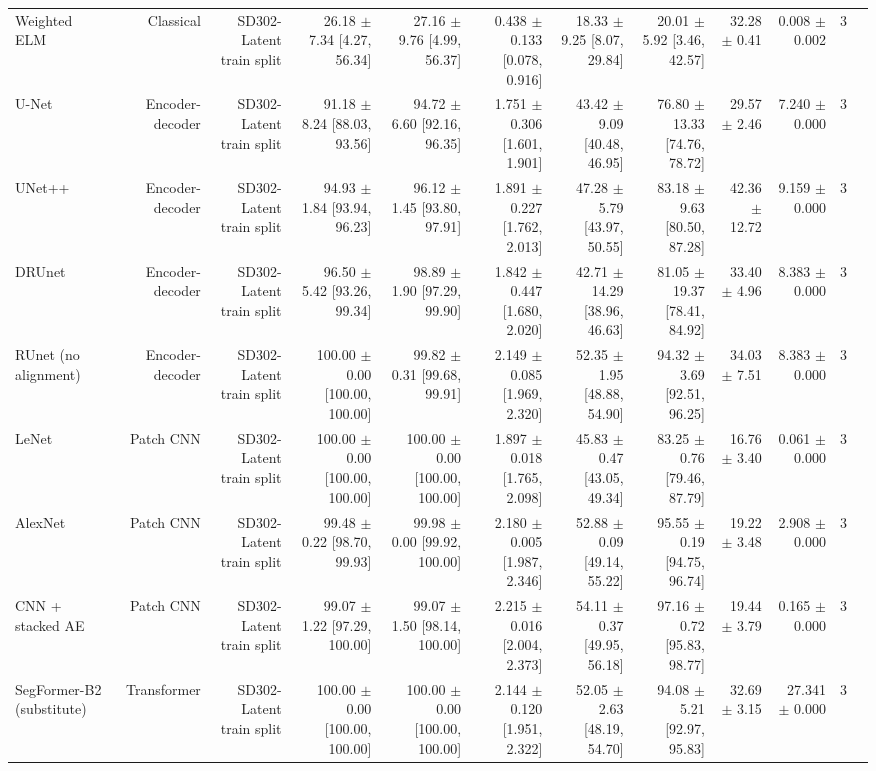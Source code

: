 \begin{table}[t]
\begin{tabular}{lrrrrrrrrrrr}
Weighted ELM & Classical & SD302-Latent train split & 26.18 $\pm$ 7.34 [4.27, 56.34] & 27.16 $\pm$ 9.76 [4.99, 56.37] & 0.438 $\pm$ 0.133 [0.078, 0.916] & 18.33 $\pm$ 9.25 [8.07, 29.84] & 20.01 $\pm$ 5.92 [3.46, 42.57] & 32.28 $\pm$ 0.41 & 0.008 $\pm$ 0.002 & 3 &  \\
U-Net & Encoder-decoder & SD302-Latent train split & 91.18 $\pm$ 8.24 [88.03, 93.56] & 94.72 $\pm$ 6.60 [92.16, 96.35] & 1.751 $\pm$ 0.306 [1.601, 1.901] & 43.42 $\pm$ 9.09 [40.48, 46.95] & 76.80 $\pm$ 13.33 [74.76, 78.72] & 29.57 $\pm$ 2.46 & 7.240 $\pm$ 0.000 & 3 &  \\
UNet++ & Encoder-decoder & SD302-Latent train split & 94.93 $\pm$ 1.84 [93.94, 96.23] & 96.12 $\pm$ 1.45 [93.80, 97.91] & 1.891 $\pm$ 0.227 [1.762, 2.013] & 47.28 $\pm$ 5.79 [43.97, 50.55] & 83.18 $\pm$ 9.63 [80.50, 87.28] & 42.36 $\pm$ 12.72 & 9.159 $\pm$ 0.000 & 3 &  \\
DRUnet & Encoder-decoder & SD302-Latent train split & 96.50 $\pm$ 5.42 [93.26, 99.34] & 98.89 $\pm$ 1.90 [97.29, 99.90] & 1.842 $\pm$ 0.447 [1.680, 2.020] & 42.71 $\pm$ 14.29 [38.96, 46.63] & 81.05 $\pm$ 19.37 [78.41, 84.92] & 33.40 $\pm$ 4.96 & 8.383 $\pm$ 0.000 & 3 &  \\
RUnet (no alignment) & Encoder-decoder & SD302-Latent train split & 100.00 $\pm$ 0.00 [100.00, 100.00] & 99.82 $\pm$ 0.31 [99.68, 99.91] & 2.149 $\pm$ 0.085 [1.969, 2.320] & 52.35 $\pm$ 1.95 [48.88, 54.90] & 94.32 $\pm$ 3.69 [92.51, 96.25] & 34.03 $\pm$ 7.51 & 8.383 $\pm$ 0.000 & 3 &  \\
LeNet & Patch CNN & SD302-Latent train split & 100.00 $\pm$ 0.00 [100.00, 100.00] & 100.00 $\pm$ 0.00 [100.00, 100.00] & 1.897 $\pm$ 0.018 [1.765, 2.098] & 45.83 $\pm$ 0.47 [43.05, 49.34] & 83.25 $\pm$ 0.76 [79.46, 87.79] & 16.76 $\pm$ 3.40 & 0.061 $\pm$ 0.000 & 3 &  \\
AlexNet & Patch CNN & SD302-Latent train split & 99.48 $\pm$ 0.22 [98.70, 99.93] & 99.98 $\pm$ 0.00 [99.92, 100.00] & 2.180 $\pm$ 0.005 [1.987, 2.346] & 52.88 $\pm$ 0.09 [49.14, 55.22] & 95.55 $\pm$ 0.19 [94.75, 96.74] & 19.22 $\pm$ 3.48 & 2.908 $\pm$ 0.000 & 3 &  \\
CNN + stacked AE & Patch CNN & SD302-Latent train split & 99.07 $\pm$ 1.22 [97.29, 100.00] & 99.07 $\pm$ 1.50 [98.14, 100.00] & 2.215 $\pm$ 0.016 [2.004, 2.373] & 54.11 $\pm$ 0.37 [49.95, 56.18] & 97.16 $\pm$ 0.72 [95.83, 98.77] & 19.44 $\pm$ 3.79 & 0.165 $\pm$ 0.000 & 3 &  \\
SegFormer-B2 (substitute) & Transformer & SD302-Latent train split & 100.00 $\pm$ 0.00 [100.00, 100.00] & 100.00 $\pm$ 0.00 [100.00, 100.00] & 2.144 $\pm$ 0.120 [1.951, 2.322] & 52.05 $\pm$ 2.63 [48.19, 54.70] & 94.08 $\pm$ 5.21 [92.97, 95.83] & 32.69 $\pm$ 3.15 & 27.341 $\pm$ 0.000 & 3 &  \\

\end{tabular}
\end{table}
